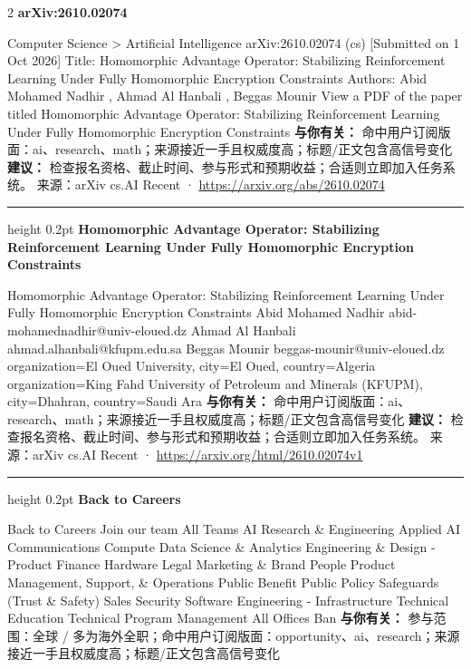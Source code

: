 \documentclass[10.5pt]{ctexart}
\begin{document}
\begin{multicols}{2}
{\large\bfseries arXiv:2610.02074}\par
Computer Science > Artificial Intelligence arXiv:2610.02074 (cs) [Submitted on 1 Oct 2026] Title: Homomorphic Advantage Operator: Stabilizing Reinforcement Learning Under Fully Homomorphic Encryption Constraints Authors: Abid Mohamed Nadhir , Ahmad Al Hanbali , Beggas Mounir View a PDF of the paper titled Homomorphic Advantage Operator: Stabilizing Reinforcement Learning Under Fully Homomorphic Encryption Constraints
\textbf{与你有关：} 命中用户订阅版面：ai、research、math；来源接近一手且权威度高；标题/正文包含高信号变化
\textbf{建议：} 检查报名资格、截止时间、参与形式和预期收益；合适则立即加入任务系统。
{\footnotesize\color{ormuted} 来源：arXiv cs.AI Recent · \url{https://arxiv.org/abs/2610.02074}}
\vspace{2mm}
\hrule height 0.2pt
\vspace{2mm}
{\large\bfseries Homomorphic Advantage Operator: Stabilizing Reinforcement Learning Under Fully Homomorphic Encryption Constraints}\par
Homomorphic Advantage Operator: Stabilizing Reinforcement Learning Under Fully Homomorphic Encryption Constraints Abid Mohamed Nadhir abid-mohamednadhir@univ-eloued.dz Ahmad Al Hanbali ahmad.alhanbali@kfupm.edu.sa Beggas Mounir beggas-mounir@univ-eloued.dz organization=El Oued University, city=El Oued, country=Algeria organization=King Fahd University of Petroleum and Minerals (KFUPM), city=Dhahran, country=Saudi Ara
\textbf{与你有关：} 命中用户订阅版面：ai、research、math；来源接近一手且权威度高；标题/正文包含高信号变化
\textbf{建议：} 检查报名资格、截止时间、参与形式和预期收益；合适则立即加入任务系统。
{\footnotesize\color{ormuted} 来源：arXiv cs.AI Recent · \url{https://arxiv.org/html/2610.02074v1}}
\vspace{2mm}
\hrule height 0.2pt
\vspace{2mm}
{\large\bfseries Back to Careers}\par
Back to Careers Join our team All Teams AI Research \& Engineering Applied AI Communications Compute Data Science \& Analytics Engineering \& Design - Product Finance Hardware Legal Marketing \& Brand People Product Management, Support, \& Operations Public Benefit Public Policy Safeguards (Trust \& Safety) Sales Security Software Engineering - Infrastructure Technical Education Technical Program Management All Offices Ban
\textbf{与你有关：} 参与范围：全球 / 多为海外全职；命中用户订阅版面：opportunity、ai、research；来源接近一手且权威度高；标题/正文包含高信号变化

\end{multicols}
\end{document}
